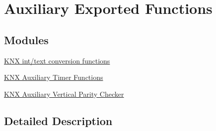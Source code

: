 \hypertarget{group___k_n_x___aux___exported___functions}{}\section{Auxiliary Exported Functions}
\label{group___k_n_x___aux___exported___functions}
\subsection*{Modules}
\begin{DoxyCompactItemize}
\item 
\hyperlink{group___k_n_x___aux___exported___functions___group1}{K\+N\+X int/text conversion functions}
\item 
\hyperlink{group___k_n_x___aux___exported___functions___group2}{K\+N\+X Auxiliary Timer Functions}
\item 
\hyperlink{group___k_n_x___aux___exported___functions___group3}{K\+N\+X Auxiliary Vertical Parity Checker}
\end{DoxyCompactItemize}


\subsection{Detailed Description}
